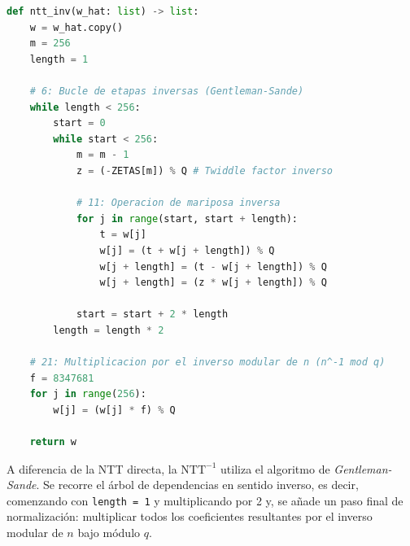 \documentclass[11pt, a4paper]{report}
\theoremstyle{definition}
\begin{document}
\begin{minipage}{\linewidth}
\begin{lstlisting}[language=Python, caption={Implementación de la NTT$^{-1}$ reflejando el Algoritmo 42.}, label={lst:invNTT_python}]
def ntt_inv(w_hat: list) -> list:
    w = w_hat.copy()
    m = 256
    length = 1
    
    # 6: Bucle de etapas inversas (Gentleman-Sande)
    while length < 256:
        start = 0
        while start < 256:
            m = m - 1
            z = (-ZETAS[m]) % Q # Twiddle factor inverso
            
            # 11: Operacion de mariposa inversa
            for j in range(start, start + length):
                t = w[j]
                w[j] = (t + w[j + length]) % Q
                w[j + length] = (t - w[j + length]) % Q
                w[j + length] = (z * w[j + length]) % Q
                
            start = start + 2 * length
        length = length * 2
        
    # 21: Multiplicacion por el inverso modular de n (n^-1 mod q)
    f = 8347681 
    for j in range(256):
        w[j] = (w[j] * f) % Q
        
    return w
\end{lstlisting}
\end{minipage}

A diferencia de la NTT directa, la $\text{NTT}^{-1}$ utiliza el algoritmo de \textit{Gentleman-Sande}. Se recorre el árbol de dependencias en sentido inverso, es decir, comenzando con \texttt{length = 1} y multiplicando por 2 y, se añade un paso final de normalización: multiplicar todos los coeficientes resultantes por el inverso modular de $n$ bajo módulo $q$.
\end{document}
